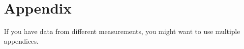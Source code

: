 \chapter{Appendix}
If you have data from different measurements, you might want to use multiple appendices.

